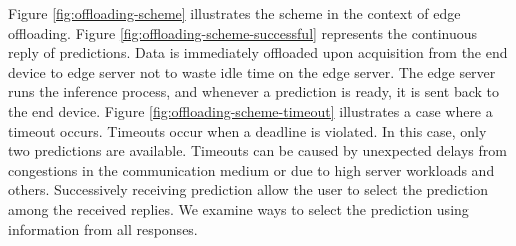 Figure \ref{fig:offloading-scheme} illustrates the scheme in the context of edge offloading. Figure \ref{fig:offloading-scheme-successful} represents the continuous reply of predictions. Data is immediately offloaded upon acquisition from the end device to edge server not to waste idle time on the edge server. The edge server runs the inference process, and whenever a prediction is ready, it is sent back to the end device. Figure \ref{fig:offloading-scheme-timeout} illustrates a case where a timeout occurs. Timeouts occur when a deadline is violated. In this case, only two predictions are available. Timeouts can be caused by unexpected delays from congestions in the communication medium or due to high server workloads and others. Successively receiving prediction allow the user to select the prediction among the received replies. We examine ways to select the prediction using information from all responses.

